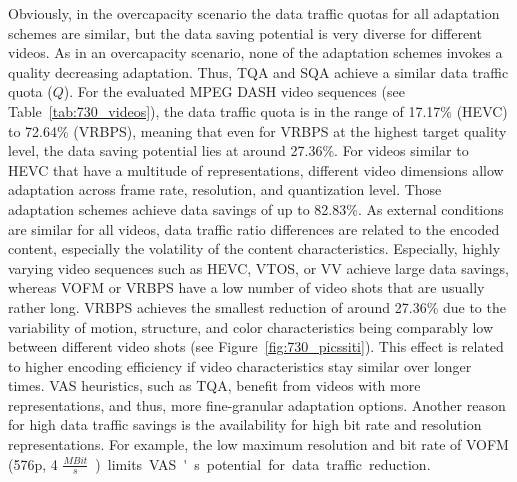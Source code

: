 Obviously, in the overcapacity scenario the data traffic quotas for all adaptation schemes are similar, but the data saving potential is very diverse for different videos. 
As in an overcapacity scenario, none of the adaptation schemes invokes a quality decreasing adaptation.
Thus, \ac{TQA} and \ac{SQA} achieve a similar data traffic quota ($Q$).
For the evaluated \ac{MPEG} \ac{DASH} video sequences (see Table~\ref{tab:730_videos}), the data traffic quota is in the range of 17.17\% (HEVC) to 72.64\% (VRBPS), meaning that even for VRBPS at the highest target quality level, the data saving potential lies at around 27.36\%.
 For videos similar to HEVC that have a multitude of representations, different video dimensions allow adaptation across frame rate, resolution, and quantization level.
Those adaptation schemes achieve data savings of up to 82.83\%.
As external conditions are similar for all videos, data traffic ratio differences are related to the encoded content, especially the volatility of the content characteristics.
Especially, highly varying video sequences such as HEVC, VTOS, or VV achieve large data savings, whereas VOFM or VRBPS have a low number of video shots that are usually rather long. 
VRBPS achieves the smallest reduction of around 27.36\% due to the variability of motion, structure, and color characteristics being comparably low between different video shots (see Figure~\ref{fig:730_picssiti}). 
This effect is related to higher encoding efficiency if video characteristics stay similar over longer times. 
\ac{VAS} heuristics, such as \ac{TQA}, benefit from videos with more representations, and thus, more fine-granular adaptation options.
Another reason for high data traffic savings is the availability for high bit rate and resolution representations.
For example, the low maximum resolution and bit rate of VOFM (\ac{576p}, 4 \unit{$\frac{MBit}{s}$}) limits \ac{VAS}'s potential for data traffic reduction.
